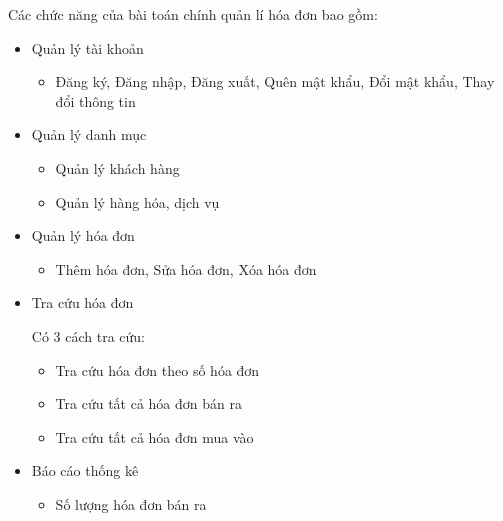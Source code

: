 Các chức năng của bài toán chính quản lí hóa đơn bao gồm:

\begin{itemize}

\item Quản lý tài khoản

\begin{itemize}

\item Đăng ký, Đăng nhập, Đăng xuất, Quên mật khẩu, Đổi mật khẩu, Thay đổi thông tin

\end{itemize}

\item Quản lý danh mục

\begin{itemize}

\item Quản lý khách hàng

\item Quản lý hàng hóa, dịch vụ

\end{itemize}

\item Quản lý hóa đơn

\begin{itemize}

\item Thêm hóa đơn, Sửa hóa đơn, Xóa hóa đơn

\end{itemize}

\item Tra cứu hóa đơn

Có 3 cách tra cứu:

\begin{itemize}

\item Tra cứu hóa đơn theo số hóa đơn

\item Tra cứu tất cả hóa đơn bán ra

\item Tra cứu tất cả hóa đơn mua vào

\end{itemize}

\item Báo cáo thống kê

\begin{itemize}

\item Số lượng hóa đơn bán ra


\end{itemize}
\end{itemize}

